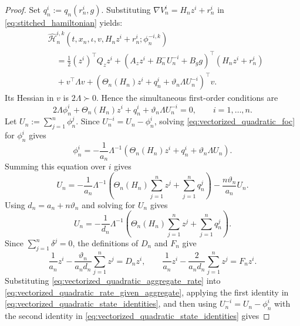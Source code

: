 \documentclass[12pt]{article}
\numberwithin{equation}{section}
\theoremstyle{definition}
\begin{document}
\begin{proof}
Set \(q_n^i:=q_n(r_n^i,g)\). Substituting
\(\nabla V_n^i=H_nz^i+r_n^i\) in \eqref{eq:stitched_hamiltonian} yields:
\begin{equation}\label{eq:vectorized_quadratic_hamiltonian}
\begin{aligned}
&\widehat{\mathscr H}_n^{i,k}
\left(t,x_n,\iota,v,H_nz^i+r_n^i;\phi_n^{-i,k}\right)
\\
&\quad={}\frac12(z^i)^\top Q_zz^i
+\left(A_zz^i+B_n^{-}U_n^{-i}+B_gg\right)^\top(H_nz^i+r_n^i)
\\
&\quad+v^\top\Lambda v
+\left(\Theta_n(H_n)z^i+q_n^i
+\vartheta_n\Lambda U_n^{-i}\right)^\top v.
\end{aligned}
\end{equation}
Its Hessian in \(v\) is \(2\Lambda\succ0\). Hence the simultaneous
first-order conditions are
\begin{equation}\label{eq:vectorized_quadratic_foc}
2\Lambda\phi_n^i+\Theta_n(H_n)z^i+q_n^i
+\vartheta_n\Lambda U_n^{-i}=0,
\qquad i=1,\ldots,n.
\end{equation}
Let \(U_n:=\sum_{j=1}^n\phi_n^j\). Since
\(U_n^{-i}=U_n-\phi_n^i\), solving
\eqref{eq:vectorized_quadratic_foc} for \(\phi_n^i\) gives
\begin{equation}\label{eq:vectorized_quadratic_rate_given_aggregate}
\phi_n^i
=-\frac1{a_n}\Lambda^{-1}
\left(\Theta_n(H_n)z^i+q_n^i+\vartheta_n\Lambda U_n\right).
\end{equation}
Summing this equation over \(i\) gives
\[
U_n
=-\frac1{a_n}\Lambda^{-1}
\left(
\Theta_n(H_n)\sum_{j=1}^nz^j+\sum_{j=1}^nq_n^j
\right)
-\frac{n\vartheta_n}{a_n}U_n.
\]
Using \(d_n=a_n+n\vartheta_n\) and solving for \(U_n\) gives
\begin{equation}\label{eq:vectorized_quadratic_aggregate_rate}
U_n
=-\frac1{d_n}\Lambda^{-1}
\left(
\Theta_n(H_n)\sum_{j=1}^nz^j+
\sum_{j=1}^nq_n^j
\right).
\end{equation}
Since \(\sum_{j=1}^n\delta^j=0\), the definitions of \(D_n\) and \(F_n\)
give
\begin{equation}\label{eq:vectorized_quadratic_state_identities}
\frac1{a_n}z^i-\frac{\vartheta_n}{a_nd_n}\sum_{j=1}^nz^j=D_nz^i,
\qquad
\frac1{a_n}z^i-\frac2{a_nd_n}\sum_{j=1}^nz^j=F_nz^i.
\end{equation}
Substituting \eqref{eq:vectorized_quadratic_aggregate_rate} into
\eqref{eq:vectorized_quadratic_rate_given_aggregate}, applying the first identity in
\eqref{eq:vectorized_quadratic_state_identities}, and then using
\(U_n^{-i}=U_n-\phi_n^i\) with the second identity in
\eqref{eq:vectorized_quadratic_state_identities} gives

\end{proof}
\end{document}
